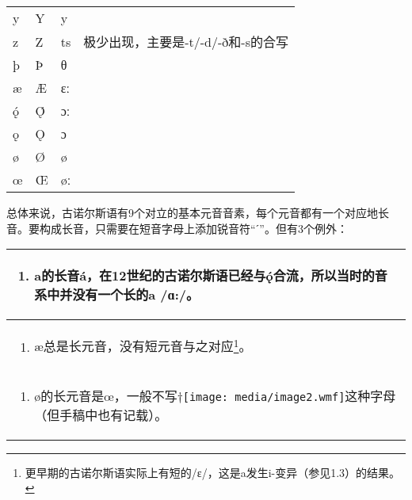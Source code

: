 \begin{longtable}{llll}
  y        & Y        & y                &                                                          \\
  z        & Z        & ts               & 极少出现，主要是-t/-d/-ð和-s的合写                       \\
  þ        & Þ        & θ                &                                                          \\
  æ        & Æ        & ɛː               &                                                          \\
  ǫ́        & Ǫ́        & ɔː               &                                                          \\
  ǫ        & Ǫ        & ɔ                &                                                          \\
  ø        & Ø        & ø                &                                                          \\
  œ        & Œ        & øː               &                                                          \\
\end{longtable}

总体来说，古诺尔斯语有9个对立的基本元音音素，每个元音都有一个对应地长音。要构成长音，只需要在短音字母上添加锐音符``ˊ''。但有3个例外：

\begin{longtable}{l}
  \toprule
  \begin{enumerate}\def\labelenumi{\arabic{enumi}.}\item  a的长音á，在12世纪的古诺尔斯语已经与ǫ́合流，所以当时的音系中并没有一个长的a  /ɑ:/。\end{enumerate} \\
  \midrule
  \endhead
  \bottomrule
  \endfoot
  \begin{minipage}[t]{\linewidth}\raggedright
    \begin{enumerate}
      \def\labelenumi{\arabic{enumi}.}
      \setcounter{enumi}{1}
      \item
            æ总是长元音，没有短元音与之对应\footnote{更早期的古诺尔斯语实际上有短的/ɛ/，这是a发生i-变异（参见1.3）的结果。}。
    \end{enumerate}
  \end{minipage}                                                                                                                        \\
  \begin{minipage}[t]{\linewidth}\raggedright
    \begin{enumerate}
      \def\labelenumi{\arabic{enumi}.}
      \setcounter{enumi}{2}
      \item
            ø的长元音是œ，一般不写†\texttt{[image: media/image2.wmf]}这种字母（但手稿中也有记载）。
    \end{enumerate}
  \end{minipage}                                                                                                                        \\
\end{longtable}

